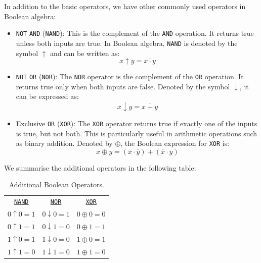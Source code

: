 In addition to the basic operators, we have other commonly used operators in Boolean algebra:

\begin{itemize}
\setlength{\itemsep}{10pt}
    \item \texttt{NOT} \texttt{AND} (\texttt{NAND}): This is the complement of the \texttt{AND} operation. It returns true unless both inputs are true. In Boolean algebra, \texttt{NAND} is denoted by the symbol $\uparrow$ and can be written as: \[
        x \uparrow y = \overline{x \cdot y}
        \]

    \item \texttt{NOT} \texttt{OR} (\texttt{NOR}): The \texttt{NOR} operator is the complement of the \texttt{OR} operation. It returns true only when both inputs are false. Denoted by the symbol $\downarrow$, it can be expressed as:
        \[
        x \downarrow y = \overline{x + y}
        \]

    \item Exclusive \texttt{OR} (\texttt{XOR}): The \texttt{XOR} operator returns true if exactly one of the inputs is true, but not both. This is particularly useful in arithmetic operations such as binary addition. Denoted by $\oplus$, the Boolean expression for \texttt{XOR} is:
        \[
        x \oplus y = (x \cdot \overline{y}) + (\overline{x} \cdot y)
        \]

\end{itemize}

We summarise the additional operators in the following table:

\begin{table}[h!]
\begin{center}
\begin{tabular}{ccc}
\underline{\texttt{NAND}} & \underline{\texttt{NOR}} & \underline{\texttt{XOR}} \\
$0 \uparrow 0 = 1$ & $0 \downarrow 0 = 1$ & $0 \oplus 0 = 0$ \\
$0 \uparrow 1 = 1$ & $0 \downarrow 1 = 0$ & $0 \oplus 1 = 1$ \\
$1 \uparrow 0 = 1$ & $1 \downarrow 0 = 0$ & $1 \oplus 0 = 1$ \\
$1 \uparrow 1 = 0$ & $1 \downarrow 1 = 0$ & $1 \oplus 1 = 0$ \\
\end{tabular}
\end{center}
    \caption{Additional Boolean Operators.}
    \label{tab:addibool}
\end{table}


